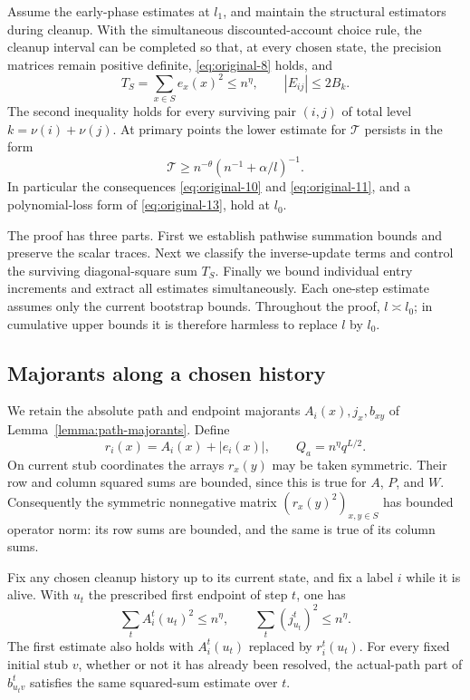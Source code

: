 \begin{samepage}
\begin{proposition}\label{prop:cleanup}
Assume the early-phase estimates at $l_1$, and maintain the structural
estimators during cleanup.  With the simultaneous discounted-account
choice rule, the cleanup interval can be completed so that, at every
chosen state, the precision matrices remain positive definite,
\eqref{eq:original-8} holds, and
\[
 T_S=\sum_{x\in S}e_x(x)^2\leq n^\eta,\qquad
 |E_{ij}|\leq2B_k.
\]
The second inequality holds for every surviving pair $(i,j)$ of total
level $k=\nu(i)+\nu(j)$.
At primary points the lower estimate for $\mathcal T$ persists in the
form
\[
 \mathcal T\geq n^{-\theta}(n^{-1}+\alpha/l)^{-1}.
\]
In particular the consequences \eqref{eq:original-10} and
\eqref{eq:original-11}, and a polynomial-loss form of
\eqref{eq:original-13}, hold at $l_0$.
\end{proposition}
\end{samepage}

The proof has three parts.  First we establish pathwise summation bounds
and preserve the scalar traces.  Next we classify the inverse-update
terms and control the surviving diagonal-square sum $T_S$.  Finally we
bound individual entry increments and extract all estimates
simultaneously.  Each one-step estimate assumes only the current
bootstrap bounds.
Throughout the proof, $l\asymp l_0$; in cumulative upper bounds it is
therefore harmless to replace $l$ by $l_0$.

\subsection{Majorants along a chosen history}

We retain the absolute path and endpoint majorants
$A_i(x),j_x,b_{xy}$ of Lemma~\ref{lemma:path-majorants}.  Define
\[
 r_i(x)=A_i(x)+|e_i(x)|,\qquad Q_a=n^\eta q^{L/2}.
\]
On current stub coordinates the arrays $r_x(y)$ may be taken
symmetric.  Their row and column squared sums are bounded, since this
is true for $A$, $P$, and $W$.  Consequently the symmetric nonnegative
matrix $(r_x(y)^2)_{x,y\in S}$ has bounded operator norm: its row sums
are bounded, and the same is true of its column sums.

\begin{lemma}\label{lem:cleanup-pathwise}
Fix any chosen cleanup history up to its current state, and fix a
label $i$ while it is alive.  With $u_t$ the prescribed first endpoint
of step $t$, one has
\begin{equation}
 \sum_t A_i^t(u_t)^2\leq n^\eta,\qquad
 \sum_t (j_{u_t}^t)^2\leq n^\eta.
\label{eq:original-36}
\end{equation}
The first estimate also holds with $A_i^t(u_t)$ replaced by
$r_i^t(u_t)$.  For every fixed initial stub $v$, whether or not it has
already been resolved, the actual-path part of $b_{u_t v}^t$ satisfies
the same squared-sum estimate over $t$.
\end{lemma}

